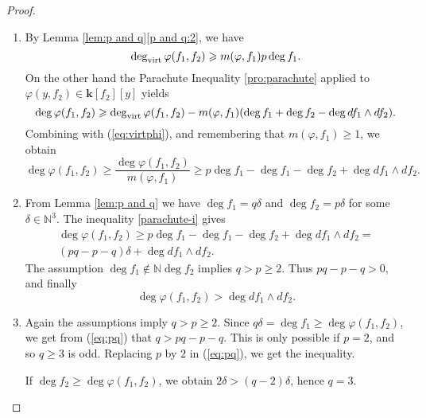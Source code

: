 \documentclass[reqno,oneside,11pt]{amsart}
\theoremstyle{plain}
\theoremstyle{definition}
\newcommand{\N}{\mathbb{N}}
\newcommand{\K}{\mathbf{k}}
\renewcommand{\phi}{\varphi}
\newcommand{\dvirt}{\deg_{\text{\rm virt}}}
\renewcommand{\ge}{\geqslant}
\begin{document}
\begin{proof}
\begin{enumerate}[wide]
\item By Lemma \ref{lem:p and q}\ref{p and q:2}, we have
\begin{equation}
\label{eq:virtphi}
\dvirt \phi(f_1,f_2) \ge  m(\phi,f_1) p \deg f_1.
\end{equation}
On the other hand the Parachute Inequality \ref{pro:parachute} applied to $\phi(y, f_2) \in \K[f_2][y]$ yields
$$\deg \phi(f_1,f_2) \ge \dvirt \phi(f_1,f_2) - m(\phi,f_1)(\deg f_1 + \deg f_2 -\deg df_1\wedge df_2).$$
Combining with (\ref{eq:virtphi}), and remembering that $m(\phi,f_1) \ge 1$, we obtain
$$\deg \phi(f_1,f_2) \ge \frac{\deg \phi(f_1,f_2)}{m(\phi,f_1)}
\ge p \deg f_1 - \deg f_1 - \deg f_2 + \deg df_1\wedge df_2.$$

\item From Lemma \ref{lem:p and q} we have $\deg f_1 = q\delta$  and  $\deg f_2 = p\delta$ for some $\delta \in \N^3$.
The inequality \ref{parachute-i} gives
\begin{multline} \label{eq:pq}
\deg \phi(f_1,f_2) \ge p\deg f_1 - \deg f_1 - \deg f_2 + \deg df_1 \wedge df_2 = \\
(pq - p - q)\delta + \deg df_1 \wedge df_2.
\end{multline}
The assumption $\deg f_1 \not\in \N \deg f_2$ implies $q > p \ge 2$.
Thus $pq - p - q >0$, and finally
$$\deg \phi(f_1,f_2) > \deg df_1 \wedge df_2.$$

\item Again the assumptions imply $q > p \ge 2$.
Since $q\delta = \deg f_1 \ge \deg \phi(f_1,f_2)$, we get from (\ref{eq:pq}) that $q > pq - p - q$.
This is only possible  if $p = 2$, and so $q \ge 3$ is odd.
Replacing $p$ by $2$ in (\ref{eq:pq}), we get the inequality.

If $\deg f_2 \ge \deg \phi(f_1,f_2)$, we obtain $2\delta > (q-2)\delta$, hence $q = 3$.\\


\end{enumerate}
\end{proof}
\end{document}
